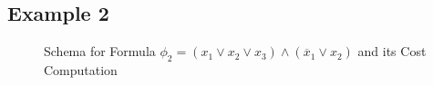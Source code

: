 \documentclass{llncs}
\newcommand{\obar}[1]{\overline{#1}}
\begin{document}
\subsection{Example 2}

\begin{figure}
\caption{Schema for Formula $\phi_2 = (x_1 \lor x_2 \lor x_3) \land (\obar{x}_1 \lor x_2)$ and its Cost Computation}
\label{fig:c3:schema}
\end{figure}
\end{document}
